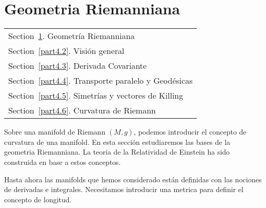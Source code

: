 \documentclass[../main]{subfiles}
\begin{document}
\section{Geometria Riemanniana}\label{part4.1}
        \begin{margintable}\vspace{.8in}\footnotesize
		\begin{tabularx}{\marginparwidth}{|X}
		  Section~\ref{part4.1}. Geometría Riemanniana\\
            Section~\ref{part4.2}. Visión general \\
            Section~\ref{part4.3}. Derivada Covariante\\
            Section~\ref{part4.4}. Transporte paralelo y Geodésicas\\
            Section~\ref{part4.5}. Simetrías y vectores de Killing\\
            Section~\ref{part4.6}. Curvatura de Riemann\\
		\end{tabularx}
	\end{margintable}

Sobre una manifold de Riemann $(M,g)$, podemos introducir el concepto de curvatura de una manifold. En esta sección estudiaremos las bases de la geometria Riemanniana. La teoria de la Relatividad de Einstein ha sido construida en base a estos conceptos.

Hasta ahora las manifolds que hemos considerado están definidas con las nociones de derivadas e integrales. Necesitamos introducir una metrica para definir el concepto de longitud.
\end{document}

